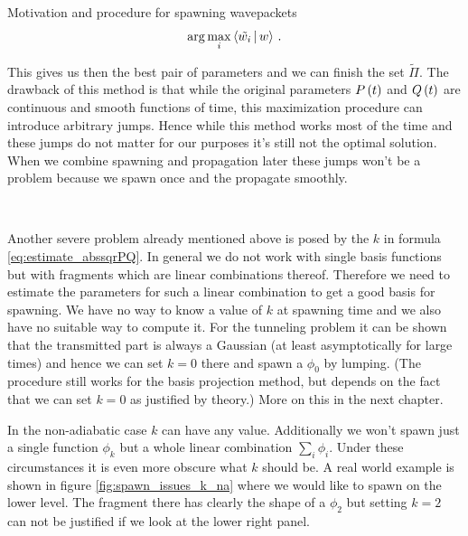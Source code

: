 \begin{chapter}{Motivation and procedure for spawning wavepackets}
\begin{equation}
  \arg \max_i \Braket{\tilde{w_i}|w} \,.
\end{equation}

This gives us then the best pair of parameters and we can finish the set $\tilde{\Pi}$.
The drawback of this method is that while the original parameters $P\left( t \right)$ and
$Q\left( t \right)$ are continuous and smooth functions of time, this maximization procedure
can introduce arbitrary jumps. Hence while this method works most of the time
and these jumps do not matter for our purposes it's still not the optimal solution.
When we combine spawning and propagation later these jumps won't be a problem
because we spawn once and the propagate smoothly.

~\newline

Another severe problem already mentioned above is posed by the $k$ in formula
\eqref{eq:estimate_abssqrPQ}. In general we do not work with single basis functions
but with fragments which are linear combinations thereof. Therefore we need to
estimate the parameters for such a linear combination to get a good basis for spawning.
We have no way to know a value of $k$ at spawning time and we also have no suitable
way to compute it. For the tunneling problem it can be shown \cite{GHJ_exponentially_accurate}
that the transmitted part is always a Gaussian (at least asymptotically for large times)
and hence we can set $k=0$ there and spawn a $\phi_0$ by lumping. (The procedure
still works for the basis projection method, but depends on the fact that
we can set $k=0$ as justified by theory.) More on this in the next chapter.

In the non-adiabatic case $k$ can have any value. Additionally we won't spawn
just a single function $\phi_k$ but a whole linear combination $\sum_i \phi_i$.
Under these circumstances it is even more obscure what $k$ should be. A real world
example is shown in figure \ref{fig:spawn_issues_k_na} where we would like to
spawn on the lower level. The fragment there has clearly the shape of a $\phi_2$
but setting $k=2$ can not be justified if we look at the lower right panel.


\end{chapter}

